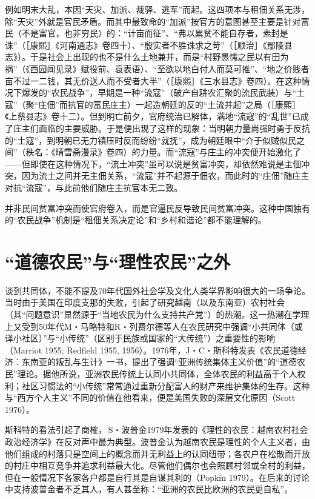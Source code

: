 \documentclass[a4paper,12pt,punct=kaiming]{ctexart}
\begin{document}
例如明末大乱，本因“天灾、加派、裁驿、逃军”而起。这四项本与租佃关系无涉，除“天灾”外就是官民矛盾。而其中最致命的“加派”按官方的意图甚至主要是针对富民（不是富官，也非穷民）的：“计亩而征”、“弗以累贫不能自存者，素封是诛”（［康熙］《河南通志》卷四十）、“殷实者不胜诛求之苛”（［顺治］《鄢陵县志》）。于是社会上出现的也不是什么土地兼并，而是“村野愚懦之民以有田为祸”（《西园闻见录》赋役前、袁表语）、“至欲以地白付人而莫可推”、“地之价贱者亩不过一二钱，其无价送人而不受者大半”（［康熙］《三水县志》卷四）。在这种情况下爆发的“农民战争”，早期是一种“流寇”（破产自耕农汇聚的流民武装）与“土寇”（聚“庄佃”而抗官的富民庄主）一起造朝廷的反的“土流并起”之局（［康熙］《上蔡县志》卷十二）。但到明亡前夕，官府统治已解体，满地“流寇”的“乱世”已成了庄主们面临的主要威胁。于是便出现了这样的现象：当明朝力量尚强时勇于反抗的“土寇”，到明朝已无力镇压时反而纷纷“就抚”，成为朝廷眼中“介于似贼似民之间”（秩名：《晴雪斋漫录》卷四）的力量。而“流寇”与庄主的冲突便开始激化了——但即使在这种情况下，“流土冲突”虽可以说是贫富冲突，却依然难说是主佃冲突，因为流土之间并无主佃关系，“流寇”并不起源于佃农，而此时的“庄佃”随庄主对抗“流寇”，与此前他们随庄主抗官本无二致。

并非民间贫富冲突而使官府卷入，而是官逼民反导致民间贫富冲突。这种中国独有的“农民战争”机制是“租佃关系决定论”和“乡村和谐论”都不能理解的。

\section*{“道德农民”与“理性农民”之外}

谈到共同体，不能不提及70年代国外社会学及文化人类学界影响很大的一场争论。当时由于美国在印度支那的失败，引起了研究越南（以及东南亚）农村社会（其“问题意识”显然源于“当地农民为什么支持共产党”）的热潮。这一热潮在学理上又受到50年代M・马略特和R・列费尔德等人在农民研究中强调“小共同体（或译小社区）”与“小传统”（区别于民族或国家的“大传统”）之重要性的影响（Marriot 1955; Redfield 1955, 1956）。1976年，J・C・斯科特发表《农民道德经济：东南亚的叛乱与生计》一书，提出了强调“亚洲传统集体主义价值”的“道德农民”理论。据他所说，亚洲农民传统上认同小共同体，全体农民的利益高于个人权利；社区习惯法的“小传统”常常通过重新分配富人的财产来维护集体的生存。这种与“西方个人主义”不同的价值在他看来，便是美国失败的深层文化原因（Scott 1976）。

斯科特的看法引起了商榷， S・波普金1979年发表的《理性的农民：越南农村社会政治经济学》在反对声中最为典型。波普金认为越南农民是理性的个人主义者，由他们组成的村落只是空间上的概念而并无利益上的认同纽带；各农户在松散而开放的村庄中相互竞争并追求利益最大化。尽管他们偶尔也会照顾村邻或全村的利益，但在一般情况下各家各户都是自行其是自谋其利的（Popkin 1979）。在后来的讨论中支持波普金者不乏其人，有人甚至称：“亚洲的农民比欧洲的农民更自私”。
\end{document}
